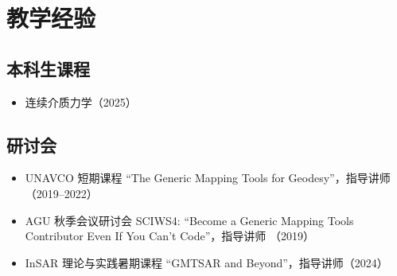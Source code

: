 \section{教学经验}

\subsection{本科生课程}
\begin{itemize}
\item 连续介质力学（2025）
\end{itemize}

\subsection{研讨会}
\begin{itemize}
\item UNAVCO 短期课程 ``The Generic Mapping Tools for Geodesy''，指导讲师（2019--2022）
\item AGU 秋季会议研讨会 SCIWS4: ``Become a Generic Mapping Tools Contributor Even If You Can't Code''，指导讲师 （2019）
\item InSAR 理论与实践暑期课程 ``GMTSAR and Beyond''，指导讲师（2024）
\end{itemize}

